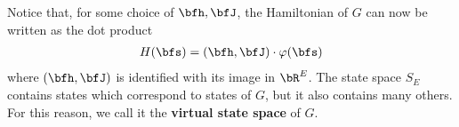 \documentclass[raggedright, nofonts, notitlepage, openany, debug]{tufte-book}
\begin{document}
Notice that, for some choice of $\bfh, \bfJ$, the Hamiltonian of $G$ can now be written as the dot product
\begin{align*}
  H(\bfs) = (\bfh,\bfJ) \cdot \varphi(\bfs)
\end{align*}
where $(\bfh,\bfJ)$ is identified with its image in $\bR^E$. The state space $S_E$ contains states which correspond to states of $G$, but it also contains many others. For this reason, we call it the \textbf{virtual state space} of $G$.

\newpage


\end{document}

